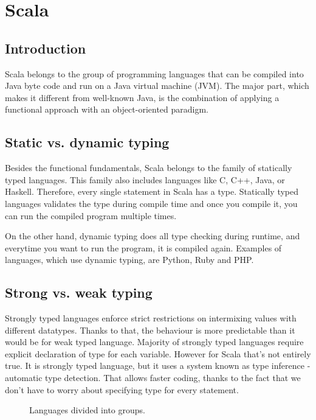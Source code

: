 \section{Scala}
\subsection{Introduction}
Scala belongs to the group of programming languages that can be compiled into Java byte code and run on a Java virtual machine (JVM). The major part, which makes it different from well-known Java, is the combination of applying a functional approach with an object-oriented paradigm. 

\subsection{Static vs. dynamic typing}
Besides the functional fundamentals, Scala belongs to the family of statically typed languages. This family also includes languages like C, C++, Java, or Haskell. Therefore, every single statement in Scala has a type.\cite{Static vs dynamic} Statically typed languages validates the type during compile time and once you compile it, you can run the compiled program multiple times.

On the other hand, dynamic typing does all type checking during runtime, and everytime you want to run the program, it is compiled again. Examples of languages, which use dynamic typing, are Python, Ruby and PHP.

\subsection{Strong vs. weak typing}
Strongly typed languages enforce strict restrictions on intermixing values with different datatypes. Thanks to that, the behaviour is more predictable than it would be for weak typed language. Majority of strongly typed languages require explicit declaration of type for each variable. However for Scala that's not entirely true. It is strongly typed language, but it uses a system known as type inference - automatic type detection. That allows faster coding, thanks to the fact that we don’t have to worry about specifying type for every statement. 

\begin{figure}[h]
  \caption {Languages divided into groups.\cite{Static vs dynamic}}
\end{figure}

